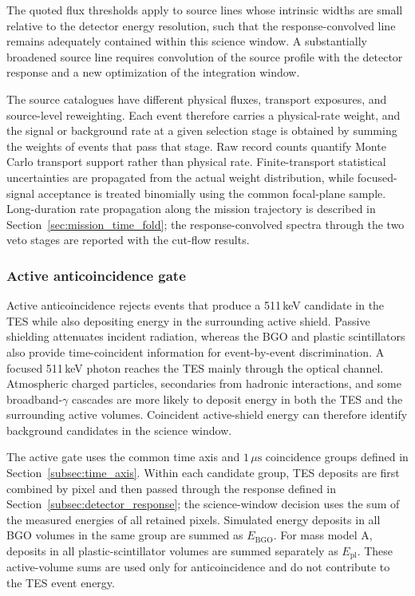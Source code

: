 \documentclass[11pt]{article}
\begin{document}
The quoted flux thresholds apply to source lines whose intrinsic widths are
small relative to the detector energy resolution, such that the
response-convolved line remains adequately contained within this science
window. A substantially broadened source line requires convolution of the
source profile with the detector response and a new optimization of the
integration window.

The source catalogues have different physical fluxes, transport exposures, and
source-level reweighting. Each event therefore carries a physical-rate weight,
and the signal or background rate at a given selection stage is obtained by
summing the weights of events that pass that stage. Raw record counts quantify
Monte Carlo transport support rather than physical rate. Finite-transport
statistical uncertainties are propagated from the actual weight distribution,
while focused-signal acceptance is treated binomially using the common focal-plane
sample. Long-duration rate propagation along the mission trajectory is described
in Section~\ref{sec:mission_time_fold}; the response-convolved spectra through
the two veto stages are reported with the cut-flow results.

\subsubsection{Active anticoincidence gate}

Active anticoincidence rejects events that produce a 511\,keV candidate in the
TES while also depositing energy in the surrounding active shield. Passive
shielding attenuates incident radiation, whereas the BGO and plastic
scintillators also provide time-coincident information for event-by-event
discrimination. A focused 511\,keV photon reaches the TES mainly through the
optical channel. Atmospheric charged particles, secondaries from hadronic
interactions, and some broadband-$\gamma$ cascades are more likely to deposit
energy in both the TES and the surrounding active volumes. Coincident
active-shield energy can therefore identify background candidates in the
science window.

The active gate uses the common time axis and $1\,\mu\mathrm{s}$ coincidence
groups defined in Section~\ref{subsec:time_axis}. Within each candidate group,
TES deposits are first combined by pixel and then passed through the response
defined in Section~\ref{subsec:detector_response}; the science-window decision
uses the sum of the measured energies of all retained pixels. Simulated energy
deposits in all BGO volumes in the same group are summed as
$E_{\mathrm{BGO}}$. For mass model A, deposits in all plastic-scintillator
volumes are summed separately as $E_{\mathrm{pl}}$. These active-volume sums
are used only for anticoincidence and do not contribute to the TES event energy.
\end{document}

